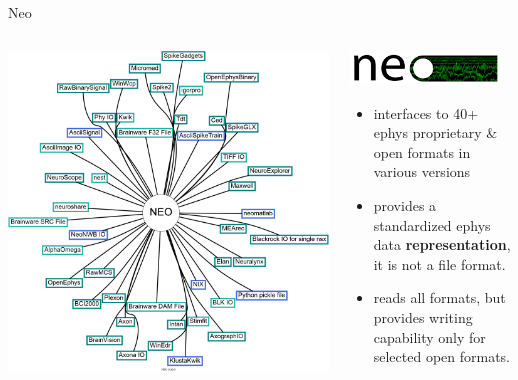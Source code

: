 \documentclass[pdftex]{beamer}
\begin{document}
\begin{frame}{Neo}
    \begin{columns}
        \begin{column}{6.5cm}
            \includegraphics[height=.8\textheight]{resources/neo_IODiagram.png}
        \end{column}
        \begin{column}{5.5cm}
        \includegraphics[width=4cm]{resources/neo_logo_transparent.png}
            \begin{itemize}
                \item interfaces to 40+ ephys proprietary \& open formats in various versions
                \vspace{1ex}
                \item provides a standardized ephys data \textbf{representation}, it is not a file format.
                \item reads all formats, but provides writing capability only for selected open formats.
            \end{itemize}
        \end{column}
    \end{columns}
\end{frame}
\end{document}
